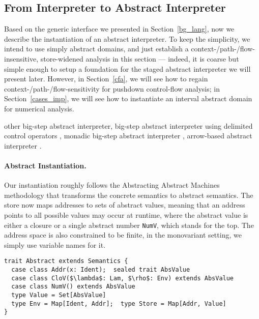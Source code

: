 \subsection{From Interpreter to Abstract Interpreter} \label{unstaged_abs}

Based on the generic interface we presented in Section~\ref{bg_lang}, 
now we describe the instantiation of an abstract interpreter.
To keep the simplicity, we intend to use simply abstract domains, and just establish a 
context-/path-/flow-insensitive, store-widened analysis in this section --- indeed, it is coarse
but simple enough to setup a foundation for the staged abstract interpreter we will present later.
However, in Section~\ref{cfa}, we will see how to regain context-/path-/flow-sensitivity 
for pushdown control-flow analysis; in Section~\ref{cases_imp}, we will see how to instantiate 
an interval abstract domain for numerical analysis.

 other big-step abstract interpreter, 
big-step abstract interpreter using delimited control operators \cite{Wei:2018:RAA:3243631.3236800},
monadic big-step abstract interpreter \cite{DBLP:journals/pacmpl/DaraisLNH17},
arrow-based abstract interpreter \cite{Keidel:2018:CSP:3243631.3236767}.

\paragraph{Abstract Instantiation.}
Our instantiation roughly follows the Abstracting Abstract Machines methodology 
\cite{DBLP:conf/icfp/HornM10, DBLP:journals/jfp/HornM12} that transforms the concrete semantics 
to abstract semantics. The store now maps addresses to sets of abstract values, meaning that an address points
to all possible values may occur at runtime, where the abstract value is either a closure or 
a single abstract number \texttt{NumV}, which stands for the top. The address space is also
constrained to be finite, in the monovariant setting, we simply use variable names for it.

\begin{lstlisting}
trait Abstract extends Semantics {
  case class Addr(x: Ident);  sealed trait AbsValue
  case class CloV($\lambda$: Lam, $\rho$: Env) extends AbsValue
  case class NumV() extends AbsValue
  type Value = Set[AbsValue]
  type Env = Map[Ident, Addr];  type Store = Map[Addr, Value]
}
\end{lstlisting}

